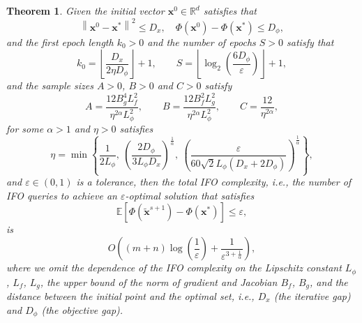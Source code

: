 \documentclass[11pt]{article}
\newtheorem{theorem}{Theorem}[section]
\newcommand{\BE}{\mathbb{E}}
\newcommand{\x}{\mathbf x}
\newcommand{\br}{\mathbb{R}}
\begin{document}
\begin{theorem}\label{Theorem:Main}
Given the initial vector $\x^0\in\br^d$ satisfies that 
\begin{equation*}
\left\|\x^0 - \x^*\right\|^2 \leq D_x, \quad \Phi(\x^0)-\Phi(\x^*) \leq D_\phi,  
\end{equation*}
and the first epoch length $k_0 >0$ and the number of epochs $S>0$ satisfy that 
\begin{equation*}
k_0 = \left\lfloor \frac{D_x}{2 \eta D_\phi} \right\rfloor + 1, \qquad S = \left\lfloor\log_2\left(\frac{6D_\phi}{\varepsilon}\right) \right\rfloor + 1, 
\end{equation*}
and the sample sizes $A>0$, $B>0$ and $C>0$ satisfy 
\begin{equation*}
A = \frac{12 B_g^4 L_f^2}{\eta^{2\alpha}L_\phi^2}, \qquad B = \frac{12 B_f^2 L_g^2}{\eta^{2\alpha}L_\phi^2},  \qquad C = \frac{12}{\eta^{2\alpha}},
\end{equation*}
for some $\alpha>1$ and $\eta>0$ satisfies 
\begin{equation*}
\eta = \min\left\{\frac{1}{2L_\phi}, \ \left(\frac{2D_\phi}{3L_\phi D_x}\right)^{\frac{1}{\alpha}}, \ \left(\frac{\varepsilon}{60\sqrt{2} L_\phi\left(D_x + 2D_\phi\right)}\right)^{\frac{1}{\alpha}}\right\}, 
\end{equation*}
and $\varepsilon\in\left(0,1\right)$ is a tolerance, then the total IFO complexity, i.e., the number of IFO queries to achieve an $\varepsilon$-optimal solution that satisfies
\begin{equation*}
\BE\left[\Phi(\tilde{\x}^{s+1}) - \Phi(\x^*)\right] \leq \varepsilon, 
\end{equation*}
is
\begin{equation*}
O\left(\left(m+n\right)\log\left(\frac{1}{\varepsilon}\right) + \frac{1}{\varepsilon^{3+\frac{1}{\alpha}}}\right),
\end{equation*}
where we omit the dependence of the IFO complexity on the Lipschitz constant $L_\phi$, $L_f$, $L_g$, the upper bound of the norm of gradient and Jacobian $B_f$, $B_g$, and the distance between the initial point and the optimal set, i.e., $D_x$ (the iterative gap) and $D_\phi$ (the objective gap).
\end{theorem}
\end{document}
